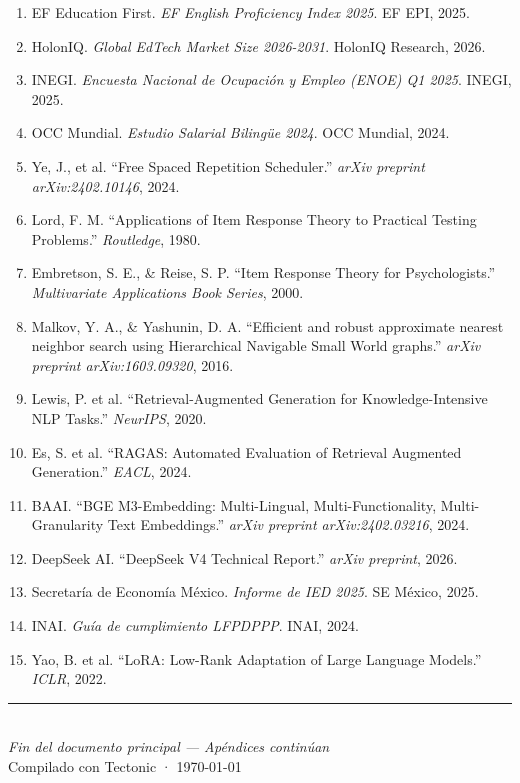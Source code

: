 \documentclass[10pt,a4paper,oneside]{report}
\begin{document}
\begin{enumerate}[leftmargin=1.6em]
\item EF Education First. \textit{EF English Proficiency Index 2025}. EF EPI, 2025.
\item HolonIQ. \textit{Global EdTech Market Size 2026-2031}. HolonIQ Research, 2026.
\item INEGI. \textit{Encuesta Nacional de Ocupación y Empleo (ENOE) Q1 2025}. INEGI, 2025.
\item OCC Mundial. \textit{Estudio Salarial Bilingüe 2024}. OCC Mundial, 2024.
\item Ye, J., et al. ``Free Spaced Repetition Scheduler.'' \textit{arXiv preprint arXiv:2402.10146}, 2024.
\item Lord, F. M. ``Applications of Item Response Theory to Practical Testing Problems.'' \textit{Routledge}, 1980.
\item Embretson, S. E., \& Reise, S. P. ``Item Response Theory for Psychologists.'' \textit{Multivariate Applications Book Series}, 2000.
\item Malkov, Y. A., \& Yashunin, D. A. ``Efficient and robust approximate nearest neighbor search using Hierarchical Navigable Small World graphs.'' \textit{arXiv preprint arXiv:1603.09320}, 2016.
\item Lewis, P. et al. ``Retrieval-Augmented Generation for Knowledge-Intensive NLP Tasks.'' \textit{NeurIPS}, 2020.
\item Es, S. et al. ``RAGAS: Automated Evaluation of Retrieval Augmented Generation.'' \textit{EACL}, 2024.
\item BAAI. ``BGE M3-Embedding: Multi-Lingual, Multi-Functionality, Multi-Granularity Text Embeddings.'' \textit{arXiv preprint arXiv:2402.03216}, 2024.
\item DeepSeek AI. ``DeepSeek V4 Technical Report.'' \textit{arXiv preprint}, 2026.
\item Secretaría de Economía México. \textit{Informe de IED 2025}. SE México, 2025.
\item INAI. \textit{Guía de cumplimiento LFPDPPP}. INAI, 2024.
\item Yao, B. et al. ``LoRA: Low-Rank Adaptation of Large Language Models.'' \textit{ICLR}, 2022.
\end{enumerate}

\vfill
\begin{center}
\color{axiomnavy}\rule{\textwidth}{0.5pt}\\[6pt]
{\small\itshape Fin del documento principal — Apéndices continúan}\\[2pt]
{\small\color{softgray} Compilado con Tectonic · \today}
\end{center}

\newpage

\end{document}
